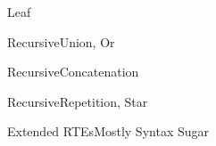 \newsavebox\leafbox
\begin{lrbox}{\leafbox}
  \begin{minipage}{12cm}
    
  \end{minipage}
\end{lrbox}

\begin{frame}{Leaf}
  \usebox\leafbox
\end{frame}

\newsavebox\orbox
\begin{lrbox}{\orbox}
  \begin{minipage}{12cm}
    
  \end{minipage}
\end{lrbox}

\newsavebox\catbox
\begin{lrbox}{\catbox}
  \begin{minipage}{12cm}
    
  \end{minipage}
\end{lrbox}


\begin{frame}{Recursive}{Union, Or}
  \usebox\orbox
 \end{frame}

\begin{frame}{Recursive}{Concatenation}
  \usebox\catbox
 \end{frame}



\newsavebox\starbox
\begin{lrbox}{\starbox}
  \begin{minipage}{12cm}
    
  \end{minipage}
\end{lrbox}


\begin{frame}{Recursive}{Repetition, Star}
  \usebox\starbox
\end{frame}


\newsavebox\extendedbox
\begin{lrbox}{\extendedbox}
  \begin{minipage}{12cm}
  
  \end{minipage}
\end{lrbox}

\begin{frame}{Extended RTEs}{Mostly Syntax Sugar}
  \usebox\extendedbox
\end{frame}


\newsavebox\exampleAbox
\begin{lrbox}{\exampleAbox}
  \begin{minipage}{12cm}
    
  \end{minipage}
\end{lrbox}

